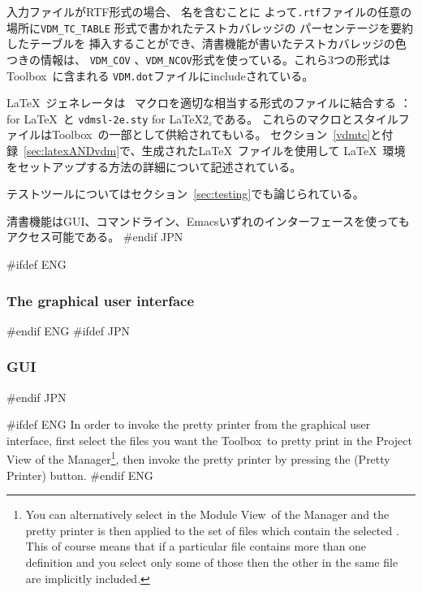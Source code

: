 \documentclass[\pformat,12pt]{article}
\newcommand{\Toolbox}{Toolbox}
\newcommand{\VdmSlPp}{\VdmSl}
\newcommand{\vdmModView}{\guicmd{Module View}}
\newcommand{\vdmModView}{\guicmd{モジュールビュー}}
\newcommand{\Toolbox}{Toolbox}
\DeclareRobustCommand{\VdmSlPp}{VDM++-\VdmSl}
\DeclareRobustCommand{\VdmSlPp}{VDM++ VICE-\VdmSl}
\newcommand{\vdmModView}{\guicmd{VDM View}}
\newcommand{\vdmModView}{\guicmd{VDMビュー}}
\newcommand{\guicmd}[1]{{\sf #1}}
\newcommand{\guicmd}[1]{{\gt #1}}
\begin{document}
入力ファイルがRTF形式の場合、 名を含むことに
よって{\tt .rtf}ファイルの任意の場所に\texttt{VDM\_TC\_TABLE} 形式で書かれたテストカバレッジの
パーセンテージを要約したテーブルを
挿入することができ、清書機能が書いたテストカバレッジの色つきの情報は、
 \texttt{VDM\_COV}  、\texttt{VDM\_NCOV}形式を使っている。これら3つの形式は\Toolbox\ に含まれる
{\tt VDM.dot}ファイルにincludeされている。

\LaTeX\ ジェネレータは \VdmSlPp\ マクロを適切な相当する形式のファイルに結合する
： for \LaTeX\ と 
{\tt vdmsl-2e.sty} for \LaTeX$2_{\varepsilon}$である。
これらのマクロとスタイルファイルは\Toolbox\ の一部として供給されてもいる。
セクション~\ref{vdmtc}と付録~\ref{sec:latexANDvdm}で、生成された\LaTeX\ ファイルを使用して
\LaTeX\ 環境をセットアップする方法の詳細について記述されている。

テストツールについてはセクション~\ref{sec:testing}でも論じられている。

清書機能はGUI、コマンドライン、Emacsいずれのインターフェースを使ってもアクセス可能である。
#endif JPN

#ifdef ENG
\subsubsection{The graphical user interface}
#endif ENG
#ifdef JPN
\subsubsection{GUI}
#endif JPN

#ifdef ENG
In order to invoke the pretty printer from the graphical user
interface, first select the files you want the \Toolbox\ to pretty
print in the \guicmd{Project View} of the
\guicmd{Manager}\footnote{You can alternatively select
   in the 
  \vdmModView\ of the \guicmd{Manager} and the pretty printer is
  then applied to the set of files which contain the selected
  . This of course means
  that if a particular file contains 
  more than one  definition and you
  select only some of those 
  then the other  in the
  same file are implicitly included.}, then 
invoke the pretty printer by  pressing the  
(\guicmd{Pretty Printer}) button.
#endif ENG
\end{document}
